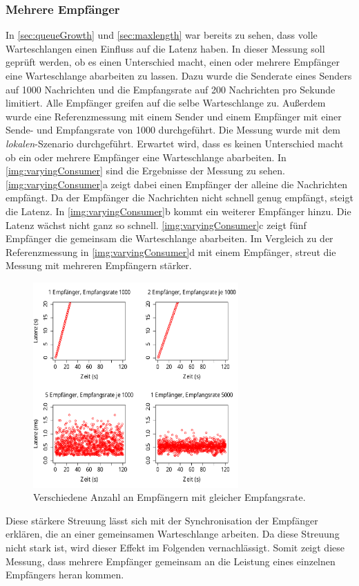 \subsubsection{Mehrere Empfänger}
\label{sec:varyingConsumer}
In \autoref{sec:queueGrowth} und \autoref{sec:maxlength} war bereits zu sehen, dass volle Warteschlangen einen Einfluss auf die Latenz haben. In dieser Messung soll geprüft werden, ob es einen Unterschied macht, einen oder mehrere Empfänger eine Warteschlange abarbeiten zu lassen. Dazu wurde die Senderate eines Senders auf 1000 Nachrichten und die Empfangsrate auf 200 Nachrichten pro Sekunde limitiert. Alle Empfänger greifen auf die selbe Warteschlange zu. Außerdem wurde eine Referenzmessung mit einem Sender und einem Empfänger mit einer Sende- und Empfangsrate von 1000 durchgeführt. Die Messung wurde mit dem \textit{lokalen}-Szenario durchgeführt. Erwartet wird, dass es keinen Unterschied macht ob ein oder mehrere Empfänger eine Warteschlange abarbeiten.
In \autoref{img:varyingConsumer} sind die Ergebnisse der Messung zu sehen. \autoref{img:varyingConsumer}a zeigt dabei einen Empfänger der alleine die Nachrichten empfängt. Da der Empfänger die Nachrichten nicht schnell genug empfängt, steigt die Latenz. In \autoref{img:varyingConsumer}b kommt ein weiterer Empfänger hinzu. Die Latenz wächst nicht ganz so schnell. \autoref{img:varyingConsumer}c zeigt fünf Empfänger die gemeinsam die Warteschlange abarbeiten. Im Vergleich zu der Referenzmessung in \autoref{img:varyingConsumer}d mit einem Empfänger, streut die Messung mit mehreren Empfängern stärker.
\begin{figure}
\center
  \includegraphics[width=0.7\textwidth]{images/measurement/varying-consumer.pdf}
  \caption{Verschiedene Anzahl an Empfängern mit gleicher Empfangsrate.}
  \label{img:varyingConsumer}
\end{figure}
Diese stärkere Streuung lässt sich mit der Synchronisation der Empfänger erklären, die an einer gemeinsamen Warteschlange arbeiten. Da diese Streuung nicht stark ist, wird dieser Effekt im Folgenden vernachlässigt. Somit zeigt diese Messung, dass mehrere Empfänger gemeinsam an die Leistung eines einzelnen Empfängers heran kommen. 

